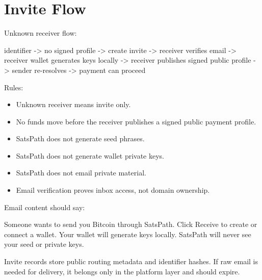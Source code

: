 \documentclass[
]{article}
\author{}
\date{}
\newenvironment{Shaded}{}{}
\newcommand{\NormalTok}[1]{#1}
\providecommand{\tightlist}{%
  \setlength{\itemsep}{0pt}\setlength{\parskip}{0pt}}
\begin{document}
\hypertarget{invite-flow}{%
\section{Invite Flow}\label{invite-flow}}

Unknown receiver flow:

\begin{Shaded}
\begin{Highlighting}[]
\NormalTok{identifier {-}\textgreater{} no signed profile {-}\textgreater{} create invite {-}\textgreater{} receiver verifies email {-}\textgreater{} receiver wallet generates keys locally {-}\textgreater{} receiver publishes signed public profile {-}\textgreater{} sender re{-}resolves {-}\textgreater{} payment can proceed}
\end{Highlighting}
\end{Shaded}

Rules:

\begin{itemize}
\tightlist
\item
  Unknown receiver means invite only.
\item
  No funds move before the receiver publishes a signed public payment
  profile.
\item
  SatsPath does not generate seed phrases.
\item
  SatsPath does not generate wallet private keys.
\item
  SatsPath does not email private material.
\item
  Email verification proves inbox access, not domain ownership.
\end{itemize}

Email content should say:

\begin{Shaded}
\begin{Highlighting}[]
\NormalTok{Someone wants to send you Bitcoin through SatsPath.}
\NormalTok{Click Receive to create or connect a wallet.}
\NormalTok{Your wallet will generate keys locally.}
\NormalTok{SatsPath will never see your seed or private keys.}
\end{Highlighting}
\end{Shaded}

Invite records store public routing metadata and identifier hashes. If
raw email is needed for delivery, it belongs only in the platform layer
and should expire.
\end{document}
